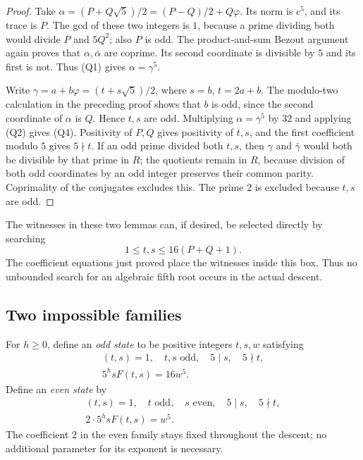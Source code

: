 \begin{proof}
Take
\(\alpha=(P+Q\sqrt5)/2=(P-Q)/2+Q\varphi\).
Its norm is \(c^5\), and its trace is \(P\).
The gcd of these two integers is \(1\), because a prime dividing both
would divide \(P\) and \(5Q^2\); also \(P\) is odd.
The product-and-sum Bezout argument again proves that
\(\alpha,\bar\alpha\) are coprime.  Its second coordinate is divisible
by \(5\) and its first is not.  Thus (Q1) gives \(\alpha=\gamma^5\).

Write \(\gamma=a+b\varphi=(t+s\sqrt5)/2\), where
\(s=b\), \(t=2a+b\).  The modulo-two calculation in the preceding
proof shows that \(b\) is odd, since the second coordinate of
\(\alpha\) is \(Q\).  Hence \(t,s\) are odd.
Multiplying \(\alpha=\gamma^5\) by \(32\) and applying (Q2) gives
(Q4).  Positivity of \(P,Q\) gives positivity of \(t,s\), and the
first coefficient modulo \(5\) gives \(5\nmid t\).
If an odd prime divided both \(t,s\), then \(\gamma\) and
\(\bar\gamma\) would both be divisible by that prime in \(R\);
the quotients remain in \(R\), because division of both odd
coordinates by an odd integer preserves their common parity.
Coprimality of the conjugates excludes this.  The prime \(2\) is
excluded because \(t,s\) are odd.
\end{proof}

The witnesses in these two lemmas can, if desired, be selected directly
by searching
\[
 1\le t,s\le16(P+Q+1).
 \tag{Q5}\label{eq:quintic-root-bound}
\]
The coefficient equations just proved place the witnesses inside this
box.  Thus no unbounded search for an algebraic fifth root occurs in
the actual descent.

\subsection{Two impossible families}

For \(h\ge0\), define an \emph{odd state} to be positive integers
\(t,s,w\) satisfying
\[
 \begin{gathered}
 (t,s)=1,\quad t,s\text{ odd},\quad5\mid s,\quad5\nmid t,\\
 5^h sF(t,s)=16w^5.
 \end{gathered}
 \tag{Q6}\label{eq:quintic-oddstate}
\]
Define an \emph{even state} by
\[
 \begin{gathered}
 (t,s)=1,\quad t\text{ odd},\quad s\text{ even},
 \quad5\mid s,\quad5\nmid t,\\
 2\cdot5^h sF(t,s)=w^5.
 \end{gathered}
 \tag{Q7}\label{eq:quintic-evenstate}
\]
The coefficient \(2\) in the even family stays fixed throughout the
descent; no additional parameter for its exponent is necessary.

